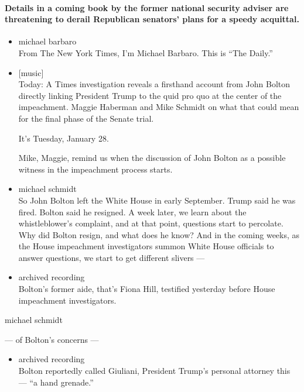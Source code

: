 \hypertarget{details-in-a-coming-book-by-the-former-national-security-adviser-are-threatening-to-derail-republican-senators-plans-for-a-speedy-acquittal}{%
\paragraph{Details in a coming book by the former national security
adviser are threatening to derail Republican senators' plans for a
speedy
acquittal.}\label{details-in-a-coming-book-by-the-former-national-security-adviser-are-threatening-to-derail-republican-senators-plans-for-a-speedy-acquittal}}

\begin{itemize}
\item
  michael barbaro\\
  From The New York Times, I'm Michael Barbaro. This is ``The Daily.''
\item
  {[}music{]}\\
  Today: A Times investigation reveals a firsthand account from John
  Bolton directly linking President Trump to the quid pro quo at the
  center of the impeachment. Maggie Haberman and Mike Schmidt on what
  that could mean for the final phase of the Senate trial.

  It's Tuesday, January 28.

  Mike, Maggie, remind us when the discussion of John Bolton as a
  possible witness in the impeachment process starts.
\item
  michael schmidt\\
  So John Bolton left the White House in early September. Trump said he
  was fired. Bolton said he resigned. A week later, we learn about the
  whistleblower's complaint, and at that point, questions start to
  percolate. Why did Bolton resign, and what does he know? And in the
  coming weeks, as the House impeachment investigators summon White
  House officials to answer questions, we start to get different slivers
  ---
\item
  archived recording\\
  Bolton's former aide, that's Fiona Hill, testified yesterday before
  House impeachment investigators.
\end{itemize}

michael schmidt

--- of Bolton's concerns ---

\begin{itemize}
\tightlist
\item
  archived recording\\
  Bolton reportedly called Giuliani, President Trump's personal attorney
  this --- ``a hand grenade.''
\end{itemize}

